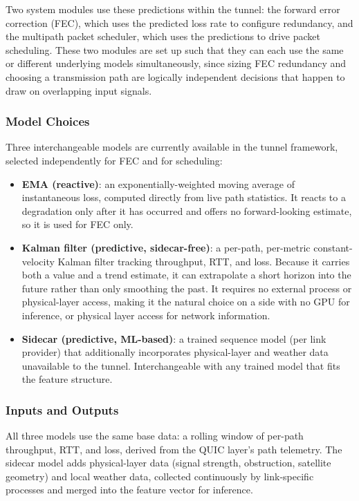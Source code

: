 \documentclass[sigconf,nonacm]{acmart}
\begin{document}
Two system modules use these predictions within the tunnel: the forward error correction (FEC), which uses the predicted loss rate to configure redundancy, and the multipath packet scheduler, which uses the predictions to drive packet scheduling. These two modules are set up such that they can each use the same or different underlying models simultaneously, since sizing FEC redundancy and choosing a transmission path are logically independent decisions that happen to draw on overlapping input signals.

\subsubsection{Model Choices}

Three interchangeable models are currently available in the tunnel framework, selected independently for FEC and for scheduling:

\begin{itemize}
  \item \textbf{EMA (reactive)}: an exponentially-weighted moving average of instantaneous loss, computed directly from live path statistics. It reacts to a degradation only after it has occurred and offers no forward-looking estimate, so it is used for FEC only.
  \item \textbf{Kalman filter (predictive, sidecar-free)}: a per-path, per-metric constant-velocity Kalman filter tracking throughput, RTT, and loss. Because it carries both a value and a trend estimate, it can extrapolate a short horizon into the future rather than only smoothing the past. It requires no external process or physical-layer access, making it the natural choice on a side with no GPU for inference, or physical layer access for network information.
  \item \textbf{Sidecar (predictive, ML-based)}: a trained sequence model (per link provider) that additionally incorporates physical-layer and weather data unavailable to the tunnel. Interchangeable with any trained model that fits the feature structure.
\end{itemize}

\subsubsection{Inputs and Outputs}

All three models use the same base data: a rolling window of per-path throughput, RTT, and loss, derived from the QUIC layer's path telemetry. The sidecar model adds physical-layer data (signal strength, obstruction, satellite geometry) and local weather data, collected continuously by link-specific processes and merged into the feature vector for inference.
\end{document}
